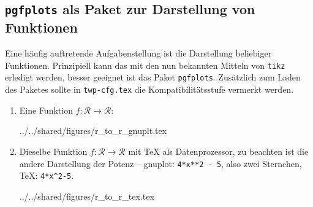 \documentclass[ngerman,               %
               a4paper,               %
               fleqn,                 %
                     ]{scrartcl}       %
\begin{document}
\subsection{\texttt{pgfplots} als Paket zur Darstellung von Funktionen}

Eine häufig auftretende Aufgabenstellung ist die Darstellung beliebiger
Funktionen. Prinzipiell kann das mit den nun bekannten Mitteln von
\texttt{tikz} erledigt werden, besser geeignet ist das Paket \texttt{pgfplots}.
Zusätzlich zum Laden des Paketes sollte in \texttt{twp-cfg.tex} die
Kompatibilitätsstufe vermerkt werden.

\begin{enumerate}
  \item Eine Funktion \(f: \mathcal R \rightarrow \mathcal R\):
\begin{verbatimwrite}{../../shared/figures/r_to_r_gnuplt.tex}
\end{verbatimwrite}
    

    

  \item Dieselbe Funktion \(f: \mathcal R \rightarrow \mathcal R\) mit
    \TeX{} als Datenprozessor, zu beachten ist die andere Darstellung der
    Potenz -- gnuplot: \lstinline|4*x**2 - 5|, also zwei Sternchen, \TeX:
    \lstinline|4*x^2-5|.
\begin{verbatimwrite}{../../shared/figures/r_to_r_tex.tex}
\end{verbatimwrite}
    


\end{enumerate}
\end{document}
